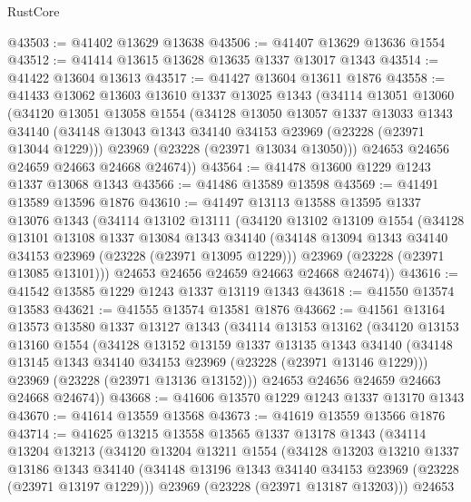\begin{lexlean}{RustCore}
\begin{coremodule}
@43503 := @41402 @13629 @13638
@43506 := @41407 @13629 @13636 @1554
@43512 := @41414 @13615 @13628 @13635 @1337 @13017 @1343
@43514 := @41422 @13604 @13613
@43517 := @41427 @13604 @13611 @1876
@43558 := @41433
    @13062
    @13603
    @13610
    @1337
    @13025
    @1343
    (@34114
      @13051
      @13060
      (@34120
        @13051
        @13058
        @1554
        (@34128
          @13050
          @13057
          @1337
          @13033
          @1343
          @34140
          (@34148 @13043 @1343 @34140 @34153 @23969 (@23228 (@23971 @13044 @1229)))
          @23969
          (@23228 (@23971 @13034 @13050)))
        @24653
        @24656
        @24659
        @24663
        @24668
        @24674))
@43564 := @41478 @13600 @1229 @1243 @1337 @13068 @1343
@43566 := @41486 @13589 @13598
@43569 := @41491 @13589 @13596 @1876
@43610 := @41497
    @13113
    @13588
    @13595
    @1337
    @13076
    @1343
    (@34114
      @13102
      @13111
      (@34120
        @13102
        @13109
        @1554
        (@34128
          @13101
          @13108
          @1337
          @13084
          @1343
          @34140
          (@34148 @13094 @1343 @34140 @34153 @23969 (@23228 (@23971 @13095 @1229)))
          @23969
          (@23228 (@23971 @13085 @13101)))
        @24653
        @24656
        @24659
        @24663
        @24668
        @24674))
@43616 := @41542 @13585 @1229 @1243 @1337 @13119 @1343
@43618 := @41550 @13574 @13583
@43621 := @41555 @13574 @13581 @1876
@43662 := @41561
    @13164
    @13573
    @13580
    @1337
    @13127
    @1343
    (@34114
      @13153
      @13162
      (@34120
        @13153
        @13160
        @1554
        (@34128
          @13152
          @13159
          @1337
          @13135
          @1343
          @34140
          (@34148 @13145 @1343 @34140 @34153 @23969 (@23228 (@23971 @13146 @1229)))
          @23969
          (@23228 (@23971 @13136 @13152)))
        @24653
        @24656
        @24659
        @24663
        @24668
        @24674))
@43668 := @41606 @13570 @1229 @1243 @1337 @13170 @1343
@43670 := @41614 @13559 @13568
@43673 := @41619 @13559 @13566 @1876
@43714 := @41625
    @13215
    @13558
    @13565
    @1337
    @13178
    @1343
    (@34114
      @13204
      @13213
      (@34120
        @13204
        @13211
        @1554
        (@34128
          @13203
          @13210
          @1337
          @13186
          @1343
          @34140
          (@34148 @13196 @1343 @34140 @34153 @23969 (@23228 (@23971 @13197 @1229)))
          @23969
          (@23228 (@23971 @13187 @13203)))
        @24653

\end{coremodule}
\end{lexlean}
